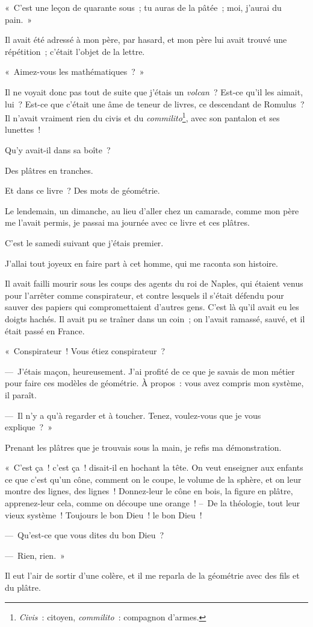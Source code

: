 \documentclass[french,twoside]{book} %
\begin{document}
« C’est une leçon de quarante sous ; tu auras de la pâtée ; moi, j’aurai du pain. »\par
Il avait été adressé à mon père, par hasard, et mon père lui avait trouvé une répétition ; c’était l’objet de la lettre.\par
« Aimez-vous les mathématiques ? »\par
Il ne voyait donc pas tout de suite que j’étais un \emph{volcan} ? Est-ce qu’il les aimait, lui ? Est-ce que c’était une âme de teneur de livres, ce descendant de Romulus ? Il n’avait vraiment rien du civis et du \emph{commilito}\footnote{\emph{Civis} : citoyen, \emph{commilito} : compagnon d’armes.}, avec son pantalon et ses lunettes !\par
Qu’y avait-il dans sa boîte ?\par
Des plâtres en tranches.\par
Et dans ce livre ? Des mots de géométrie.\par
\bigbreak
\noindent Le lendemain, un dimanche, au lieu d’aller chez un camarade, comme mon père me l’avait permis, je passai ma journée avec ce livre et ces plâtres.\par
C’est le samedi suivant que j’étais premier.\par
J’allai tout joyeux en faire part à cet homme, qui me raconta son histoire.\par
Il avait failli mourir sous les coups des agents du roi de Naples, qui étaient venus pour l’arrêter comme conspirateur, et contre lesquels il s’était défendu pour sauver des papiers qui compromettaient d’autres gens. C’est là qu’il avait eu les doigts hachés. Il avait pu se traîner dans un coin ; on l’avait ramassé, sauvé, et il était passé en France.\par
« Conspirateur ! Vous étiez conspirateur ?\par
— J’étais maçon, heureusement. J’ai profité de ce que je savais de mon métier pour faire ces modèles de géométrie. À propos : vous avez compris mon système, il paraît.\par
— Il n’y a qu’à regarder et à toucher. Tenez, voulez-vous que je vous explique ? »\par
Prenant les plâtres que je trouvais sous la main, je refis ma démonstration.\par
« C’est ça ! c’est ça ! disait-il en hochant la tête. On veut enseigner aux enfants ce que c’est qu’un cône, comment on le coupe, le volume de la sphère, et on leur montre des lignes, des lignes ! Donnez-leur le cône en bois, la figure en plâtre, apprenez-leur cela, comme on découpe une orange ! – De la théologie, tout leur vieux système ! Toujours le bon Dieu ! le bon Dieu !\par
— Qu’est-ce que vous dites du bon Dieu ?\par
— Rien, rien. »\par
Il eut l’air de sortir d’une colère, et il me reparla de la géométrie avec des fils et du plâtre.
\end{document}
